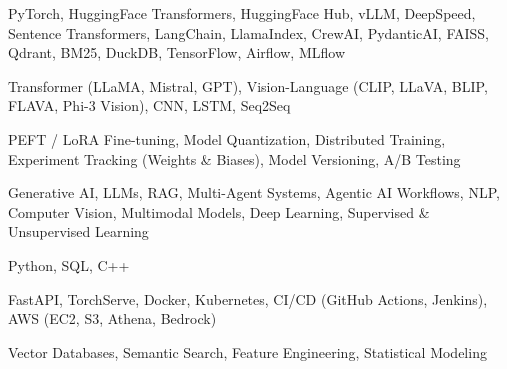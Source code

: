 \documentclass[letter,10pt]{article}
\begin{document}
 PyTorch, HuggingFace Transformers, HuggingFace Hub, vLLM, DeepSpeed, Sentence Transformers, LangChain, LlamaIndex, CrewAI, PydanticAI, FAISS, Qdrant, BM25, DuckDB, TensorFlow, Airflow, MLflow\par\vspace{2pt}

 Transformer (LLaMA, Mistral, GPT), Vision-Language (CLIP, LLaVA, BLIP, FLAVA, Phi-3 Vision), CNN, LSTM, Seq2Seq\par\vspace{2pt}

 PEFT / LoRA Fine-tuning, Model Quantization, Distributed Training, Experiment Tracking (Weights \& Biases), Model Versioning, A/B Testing\par\vspace{2pt}

 Generative AI, LLMs, RAG, Multi-Agent Systems, Agentic AI Workflows, NLP, Computer Vision, Multimodal Models, Deep Learning, Supervised \& Unsupervised Learning\par\vspace{2pt}

 Python, SQL, C++\par\vspace{2pt}

 FastAPI, TorchServe, Docker, Kubernetes, CI/CD (GitHub Actions, Jenkins), AWS (EC2, S3, Athena, Bedrock)\par\vspace{2pt}

 Vector Databases, Semantic Search, Feature Engineering, Statistical Modeling
\end{document}
